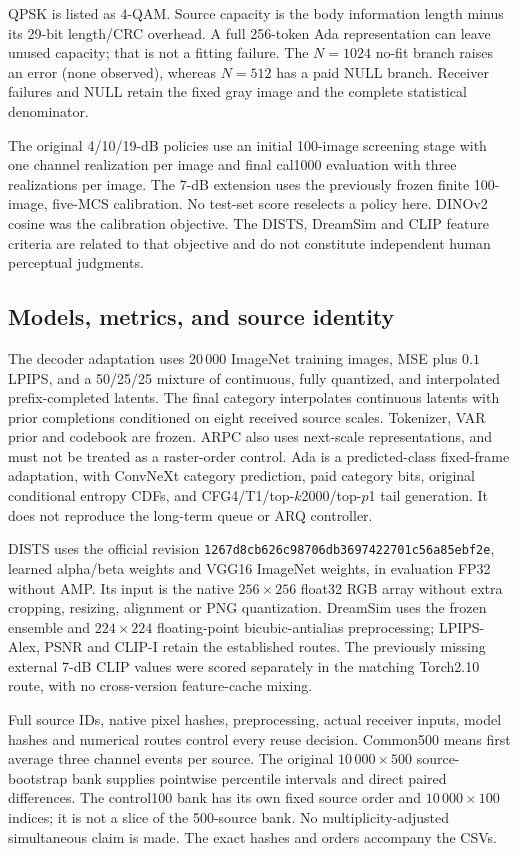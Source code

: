 \documentclass[10pt,letterpaper]{article}
\begin{document}
QPSK is listed as 4-QAM. Source capacity is the body information length minus its 29-bit length/CRC overhead. A full 256-token Ada representation can leave unused capacity; that is not a fitting failure. The $N=1024$ no-fit branch raises an error (none observed), whereas $N=512$ has a paid NULL branch. Receiver failures and NULL retain the fixed gray image and the complete statistical denominator.

The original 4/10/19-dB policies use an initial 100-image screening stage with one channel realization per image and final cal1000 evaluation with three realizations per image. The 7-dB extension uses the previously frozen finite 100-image, five-MCS calibration. No test-set score reselects a policy here. DINOv2 cosine was the calibration objective. The DISTS, DreamSim and CLIP feature criteria are related to that objective and do not constitute independent human perceptual judgments.

\subsection{Models, metrics, and source identity}
The decoder adaptation uses 20\,000 ImageNet training images, MSE plus $0.1$ LPIPS, and a 50/25/25 mixture of continuous, fully quantized, and interpolated prefix-completed latents. The final category interpolates continuous latents with prior completions conditioned on eight received source scales. Tokenizer, VAR prior and codebook are frozen. ARPC also uses next-scale representations, and must not be treated as a raster-order control. Ada is a predicted-class fixed-frame adaptation, with ConvNeXt category prediction, paid category bits, original conditional entropy CDFs, and CFG4/T1/top-$k$2000/top-$p$1 tail generation. It does not reproduce the long-term queue or ARQ controller.

DISTS uses the official revision \texttt{1267d8cb626c98706db3697422701c56a85ebf2e}, learned alpha/beta weights and VGG16 ImageNet weights, in evaluation FP32 without AMP. Its input is the native $256\times256$ float32 RGB array without extra cropping, resizing, alignment or PNG quantization. DreamSim uses the frozen ensemble and $224\times224$ floating-point bicubic-antialias preprocessing; LPIPS-Alex, PSNR and CLIP-I retain the established routes. The previously missing external 7-dB CLIP values were scored separately in the matching Torch2.10 route, with no cross-version feature-cache mixing.

Full source IDs, native pixel hashes, preprocessing, actual receiver inputs, model hashes and numerical routes control every reuse decision. Common500 means first average three channel events per source. The original $10\,000\times500$ source-bootstrap bank supplies pointwise percentile intervals and direct paired differences. The control100 bank has its own fixed source order and $10\,000\times100$ indices; it is not a slice of the 500-source bank. No multiplicity-adjusted simultaneous claim is made. The exact hashes and orders accompany the CSVs.
\end{document}
